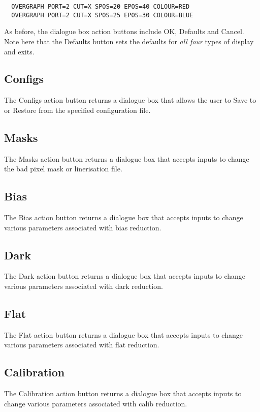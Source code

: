 \documentclass[a4paper]{book}
\renewcommand{\_}{{\tt\char'137}}
\begin{document}
\begin{verbatim}
  OVERGRAPH PORT=2 CUT=X SPOS=20 EPOS=40 COLOUR=RED
  OVERGRAPH PORT=2 CUT=X SPOS=25 EPOS=30 COLOUR=BLUE
\end{verbatim}

As before, the dialogue box action buttons include {\sf OK}, {\sf Defaults} and {\sf Cancel}.
Note here that the {\sf Defaults} button sets the defaults for {\em all four} types of display
and exits.

\subsection{Configs}
The {\sf Configs} action button returns a dialogue box that
allows the user to {\sf Save} to or {\sf Restore} from the specified configuration
file. 

\subsection{Masks}
The {\sf Masks} action button returns a dialogue box that
accepts inputs to change the bad pixel mask or linerisation file.

\subsection{Bias}
The {\sf Bias} action button returns a dialogue box that
accepts inputs to change various parameters associated with {\sc bias} reduction.

\subsection{Dark}
The {\sf Dark} action button returns a dialogue box that
accepts inputs to change various parameters associated with {\sc dark} reduction.

\subsection{Flat}
The {\sf Flat} action button returns a dialogue box that
accepts inputs to change various parameters associated with {\sc flat} reduction.

\subsection{Calibration}
The {\sf Calibration} action button returns a dialogue box that
accepts inputs to change various parameters associated with {\sc calib} reduction.
\end{document}
